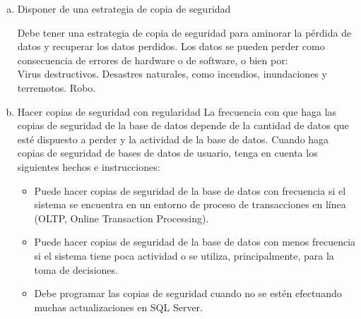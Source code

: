 \documentclass[a4paper,twocolumn,10pt]{article}
\begin{document}
   \begin{enumerate}[a)]
        \item Disponer de una estrategia de copia de seguridad

\normalsize Debe tener una estrategia de copia de seguridad para aminorar la p\'erdida de datos y recuperar los datos perdidos. Los datos se pueden perder como consecuencia de errores de hardware o de software, o bien por:\\

\normalsize Virus destructivos.
\normalsize Desastres naturales, como incendios, inundaciones y terremotos.
\normalsize Robo.\\

      \item  Hacer copias de seguridad con regularidad
La frecuencia con que haga las copias de seguridad de la base de datos depende de la cantidad de datos que est\'e dispuesto a perder y la actividad de la base de datos. Cuando haga copias de seguridad de bases de datos de usuario, tenga en cuenta los siguientes hechos e instrucciones:
 \renewcommand{\labelitemi}{$-$}
\renewcommand{\labelitemii}{$\cdot$}
    \begin{itemize}
    \item Puede hacer copias de seguridad de la base de datos con frecuencia si el sistema se encuentra en un entorno de proceso de transacciones en l\'inea (OLTP, Online Transaction Processing).
    \item Puede hacer copias de seguridad de la base de datos con menos frecuencia si el sistema tiene poca actividad o se utiliza, principalmente, para la toma de decisiones.
    \item Debe programar las copias de seguridad cuando no se est\'en efectuando muchas actualizaciones en SQL Server.
    
   \end{itemize}

 \end{enumerate}
\renewcommand{\labelitemi}{$-$}
\renewcommand{\labelitemii}{$\cdot$}
\end{document}

